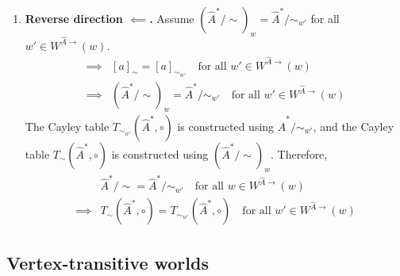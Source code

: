 \begin{proofE}
\begin{enumerate}
    \item \textbf{Reverse direction $\impliedby$.}
    Assume $(\hat{A}^{*}/\sim)_{w} = \hat{A}^{*}/\sim_{w'}$ for all $w' \in W^{\hat{A}\to}(w)$.
    \begin{align}
        \implies & [a]_{\sim} = [a]_{\sim_{w'}} \quad \text{for all $w' \in W^{\hat{A}\to}(w)$} \\
        \implies & (\hat{A}^{*}/\sim)_{w} = \hat{A}^{*}/\sim_{w'} \quad \text{for all $w' \in W^{\hat{A}\to}(w)$}
    \end{align}
    The Cayley table $T_{\sim_{w'}}(\hat{A}^{*}, \circ)$ is constructed using $\hat{A}^{*}/\sim_{w'}$, and the Cayley table $T_{\sim}(\hat{A}^{*}, \circ)$ is constructed using $(\hat{A}^{*}/\sim)_{w}$.
    Therefore,
    \begin{align}
        & \hat{A}^{*}/\sim = \hat{A}^{*}/\sim_{w'} \quad \text{for all $w \in W^{\hat{A}\to}(w)$} \\
        \implies & T_{\sim}(\hat{A}^{*}, \circ) = T_{\sim_{w'}}(\hat{A}^{*}, \circ) \quad \text{for all $w' \in W^{\hat{A}\to}(w)$}
    \end{align}
\end{enumerate}
\end{proofE}


\subsection{
Vertex-transitive worlds
}

